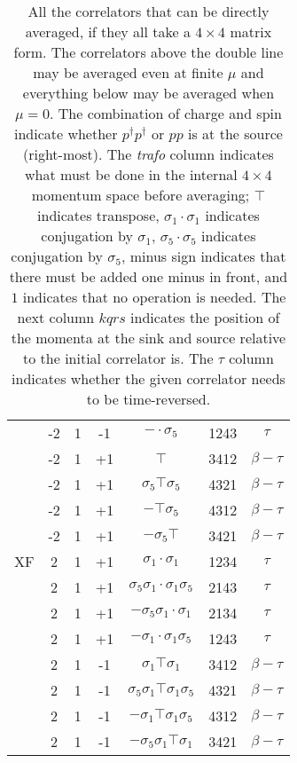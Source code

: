 \begin{table}[h]
\begin{tabular}{c|cccccc}
                    & -2 & 1 & -1 & $-\cdot\sigma_5$ & 1243 &  $\tau$  \\
                    & -2 & 1 & +1 & $\top$ & 3412 &  $\beta-\tau$  \\
                    & -2 & 1 & +1 & $\sigma_5\top\sigma_5$ & 4321 &  $\beta-\tau$  \\
                    & -2 & 1 & +1 & $-\top\sigma_5$ & 4312 &  $\beta-\tau$  \\
                    & -2 & 1 & +1 & $-\sigma_5\top$ & 3421 &  $\beta-\tau$  \\
  \hline
  XF                & 2 & 1 & +1 & $\sigma_1\cdot\sigma_1$ & 1234 &  $\tau$  \\
                    & 2 & 1 & +1 & $\sigma_5\sigma_1\cdot\sigma_1\sigma_5$ & 2143 &  $\tau$  \\
                    & 2 & 1 & +1 & $-\sigma_5\sigma_1\cdot\sigma_1$ & 2134 &  $\tau$  \\
                    & 2 & 1 & +1 & $-\sigma_1\cdot\sigma_1\sigma_5$ & 1243 &  $\tau$  \\
                    & 2 & 1 & -1 & $\sigma_1\top\sigma_1$ & 3412 &  $\beta-\tau$  \\
                    & 2 & 1 & -1 & $\sigma_5\sigma_1\top\sigma_1\sigma_5$ & 4321 &  $\beta-\tau$  \\
                    & 2 & 1 & -1 & $-\sigma_1\top\sigma_1\sigma_5$ & 4312 &  $\beta-\tau$  \\
                    & 2 & 1 & -1 & $-\sigma_5\sigma_1\top\sigma_1$ & 3421 &  $\beta-\tau$  \\
  \end{tabular}
  \caption{All the correlators that can be directly averaged, if they all take a $4 \times 4$ matrix form. The correlators above the double line may be averaged even at finite $\mu$ and everything below may be averaged when $\mu = 0$. The combination of charge and spin indicate whether $p^\dagger p^\dagger$ or $pp$ is at the source (right-most). The \textit{trafo} column indicates what must be done in the internal $4 \times 4$ momentum space before averaging; $\top$ indicates transpose, $\sigma_1\cdot\sigma_1$ indicates conjugation by $\sigma_1$, $\sigma_5\cdot\sigma_5$ indicates conjugation by $\sigma_5$, minus sign indicates that there must be added one minus in front, and $1$ indicates that no operation is needed. The next column $kqrs$ indicates the position of the momenta at the sink and source relative to the initial correlator is. The $\tau$ column indicates whether the given correlator needs to be time-reversed.}
  \label{tab:pppp}
\end{table}